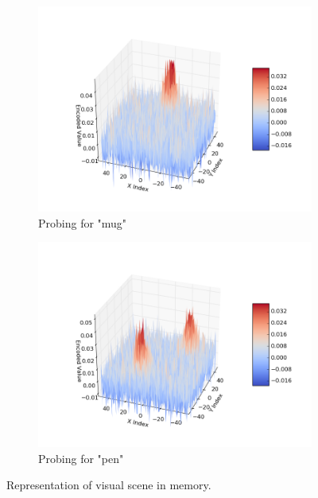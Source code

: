 \documentclass[a4paper,twoside]{article}
\begin{document}
\begin{figure}[th!]
		\begin{subfigure}{0.45\columnwidth}
			\center
			\includegraphics[width=\linewidth]{img/probe_for_mug.png}
			\caption{Probing for "mug"}
			\label{fig:probing-single}
		\end{subfigure}
		\begin{subfigure}{0.45\columnwidth}
			\center
			\includegraphics[width=\linewidth]{img/probe_for_pen.png}
			\caption{Probing for "pen"}
			\label{fig:probing-double}
		\end{subfigure}
		
		\caption{Representation of visual scene in memory. }
		
	\end{figure}
	
\end{document}
